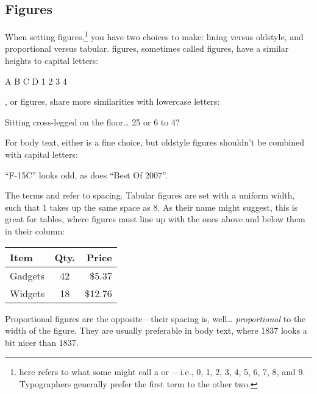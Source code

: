 \subsection{Figures}

When setting figures,\punckern\footnote{
here refers to what some might call a  or
---i.e., 0, 1, 2, 3, 4, 5, 6, 7, 8, and 9.
Typographers generally prefer the first term to the other two.}
you have two
choices to make: lining versus oldstyle,
and proportional versus tabular.
 figures, sometimes called  figures,
have a similar heights to capital letters:
\begin{leftfigure}
A B C D 1 2 3 4
\end{leftfigure}
, or  figures,
share more similarities with lowercase letters:
\begin{leftfigure}
Sitting cross-legged on the floor\ldots{} 25 or 6 to 4?
\end{leftfigure}
For body text, either is a fine choice, but oldstyle figures shouldn't
be combined with capital letters:
\begin{leftfigure}
``F-15C'' looks odd, as does ``Best Of 2007''\quotekern.
\end{leftfigure}

{
The terms  and  refer to spacing.
Tabular figures are set with a uniform width, such that 1 takes up
the same space as 8.
As their name might suggest, this is great for tables,
where figures must line up with the ones above and below them in their column:}
\begin{leftfigure}
\begin{tabular}{l|c r}
Item & Qty. & Price \\
\hline
Gadgets & 42 & \$5.37 \\
Widgets & 18 & \$12.76 \\
\end{tabular}
\end{leftfigure}
Proportional figures are the opposite---their spacing is, well\ldots{}
\emph{proportional} to the width of the figure.
They are usually preferable in body text, where 1837
looks a bit nicer than
{1837}.

